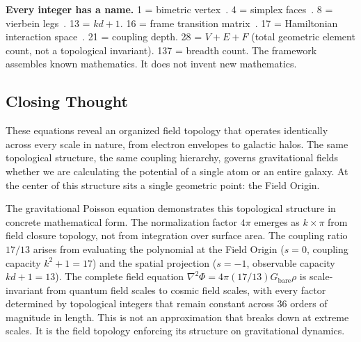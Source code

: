 \documentclass[aps,prd,preprint,superscriptaddress,showpacs,preprintnumbers,amsmath,amssymb,nofootinbib]{revtex4-2}
\begin{document}
\textbf{Every integer has a name.} 1 = bimetric vertex~\cite{hinterbichler2012}. 4 = simplex faces~\cite{ziegler1995}. 8 = vierbein legs~\cite{barbieri1998}. 13 = $kd + 1$. 16 = frame transition matrix~\cite{hassan2012}. 17 = Hamiltonian interaction space~\cite{hassankocic2018}. 21 = coupling depth. 28 = $V + E + F$ (total geometric element count, not a topological invariant). 137 = breadth count. The framework assembles known mathematics. It does not invent new mathematics.

\subsection{Closing Thought}
\label{subsec:closing}

These equations reveal an organized field topology that operates identically across every scale in nature, from electron envelopes to galactic halos. The same topological structure, the same coupling hierarchy, governs gravitational fields whether we are calculating the potential of a single atom or an entire galaxy. At the center of this structure sits a single geometric point: the Field Origin.

The gravitational Poisson equation demonstrates this topological structure in concrete mathematical form. The normalization factor $4\pi$ emerges as $k\times\pi$ from field closure topology, not from integration over surface area. The coupling ratio $17/13$ arises from evaluating the polynomial at the Field Origin ($s=0$, coupling capacity $k^2+1=17$) and the spatial projection ($s=-1$, observable capacity $kd+1=13$). The complete field equation $\nabla^2\Phi = 4\pi(17/13)G_{\text{bare}}\rho$ is scale-invariant from quantum field scales to cosmic field scales, with every factor determined by topological integers that remain constant across 36 orders of magnitude in length. This is not an approximation that breaks down at extreme scales. It is the field topology enforcing its structure on gravitational dynamics.
\end{document}
